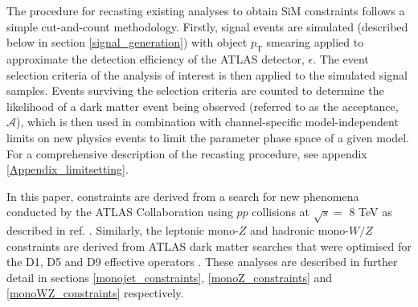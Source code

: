 The procedure for recasting existing \monoX analyses to obtain SiM constraints follows a simple cut-and-count methodology. Firstly, signal events are simulated (described below in section \ref{signal_generation}) with object $p_{\mathrm{T}}$ smearing applied to approximate the detection efficiency of the ATLAS detector, $\epsilon$. The event selection criteria of the \monoX analysis of interest is then applied to the simulated signal samples. Events surviving the selection criteria are counted to determine the likelihood of a dark matter event being observed (referred to as the acceptance, $\mathcal{A}$), which is then used in combination with channel-specific model-independent limits on new physics events to limit the parameter phase space of a given model.
For a comprehensive description of the recasting procedure, see appendix \ref{Appendix_limitsetting}.

In this paper, \monojet constraints are derived from a search for new phenomena conducted by the ATLAS Collaboration using $pp$ collisions at $\sqrt{s}=$ 8 TeV as described in ref. \cite{Aad:2015zva}. Similarly, the leptonic mono-$Z$ and hadronic mono-$W/Z$ constraints are derived from ATLAS dark matter searches that were optimised for the D1, D5 and D9 effective operators \cite{Aad:2014monoZlep,Aad:2013monoWZ}. These analyses are described in further detail in sections \ref{monojet_constraints}, \ref{monoZ_constraints} and \ref{monoWZ_constraints} respectively.


